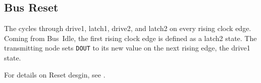 \subsection{Bus Reset}
\label{sec:protocol-reset}
The \bus cycles through {\sc drive1}, {\sc latch1}, {\sc drive2}, and {\sc
latch2} on every rising clock edge.  Coming from Bus~Idle, the first rising
clock edge is defined as a {\sc latch2 state}.
The transmitting node sets {\tt DOUT} to
its new value on the next rising edge, the {\sc drive1} state.

For details on Reset desgin, see .

